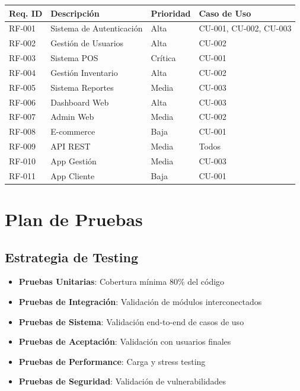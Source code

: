 \documentclass[12pt,letterpaper]{article}
\begin{document}
\begin{longtable}{|p{2cm}|p{6cm}|p{3cm}|p{4cm}|}
\hline
\rowcolor{cobrablue!20}
\textbf{Req. ID} & \textbf{Descripción} & \textbf{Prioridad} & \textbf{Caso de Uso} \\
\hline
\endhead
RF-001 & Sistema de Autenticación & Alta & CU-001, CU-002, CU-003 \\
\hline
RF-002 & Gestión de Usuarios & Alta & CU-002 \\
\hline
RF-003 & Sistema POS & Crítica & CU-001 \\
\hline
RF-004 & Gestión Inventario & Alta & CU-002 \\
\hline
RF-005 & Sistema Reportes & Media & CU-003 \\
\hline
RF-006 & Dashboard Web & Alta & CU-003 \\
\hline
RF-007 & Admin Web & Media & CU-002 \\
\hline
RF-008 & E-commerce & Baja & CU-001 \\
\hline
RF-009 & API REST & Media & Todos \\
\hline
RF-010 & App Gestión & Media & CU-003 \\
\hline
RF-011 & App Cliente & Baja & CU-001 \\
\hline
\end{longtable}

\section{Plan de Pruebas}

\subsection{Estrategia de Testing}
\begin{itemize}
    \item \textbf{Pruebas Unitarias}: Cobertura mínima 80\% del código
    \item \textbf{Pruebas de Integración}: Validación de módulos interconectados
    \item \textbf{Pruebas de Sistema}: Validación end-to-end de casos de uso
    \item \textbf{Pruebas de Aceptación}: Validación con usuarios finales
    \item \textbf{Pruebas de Performance}: Carga y stress testing
    \item \textbf{Pruebas de Seguridad}: Validación de vulnerabilidades
\end{itemize}
\end{document}
